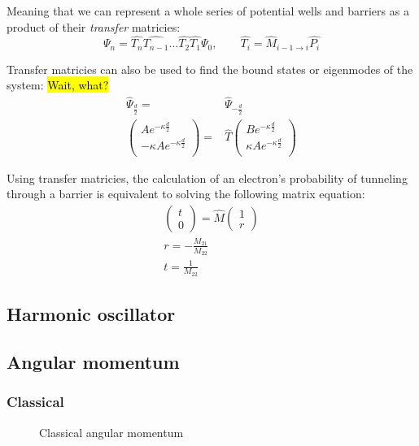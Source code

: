 			Meaning that we can represent a whole series of potential wells and barriers as a product of their \textit{transfer} matricies:
			\begin{equation}
				\Psi_n = \hat{T_n}\hat{T_{n-1}}...\hat{T_2}\hat{T_1}\Psi_0, \qquad \hat{T_i} = \hat{M}_{i-1\rightarrow i}\hat{P_i} 
			\end{equation}
			
			Transfer matricies can also be used to find the bound states or eigenmodes of the system:
			\hl{Wait, what?}
			\begin{align}
				\hat{\Psi}_{\frac{d}{2}} =& \hat{\Psi}_{-\frac{d}{2}} \\
				\begin{pmatrix}
					Ae^{-\kappa \frac{d}{2}} \\
					-\kappa Ae^{-\kappa \frac{d}{2}} \\
				\end{pmatrix} =& \hat{T} 
				\begin{pmatrix}
					Be^{-\kappa \frac{d}{2}} \\
					\kappa Ae^{-\kappa \frac{d}{2}} \\
				\end{pmatrix}
			\end{align}
			
			Using transfer matricies, the calculation of an electron's probability of tunneling through a barrier is equivalent to solving the following matrix equation:
			\begin{align}
				\begin{pmatrix}
					t \\
					0
				\end{pmatrix} = \hat{M}
				\begin{pmatrix}
					1 \\
					r
				\end{pmatrix} \\
				r  = -\frac{M_{21}}{M_{22}} \\
				t = \frac{1}{M_{22}}
			\end{align}
	\subsection{Harmonic oscillator}
	\label{sec:harmonic}
	\subsection{Angular momentum}
	\label{sec:angmomentum}
	\subsubsection{Classical}
	\begin{figure}[!h]
		\centering
		
		\caption{Classical angular momentum}
		\label{clasmoment}
	\end{figure}
	
